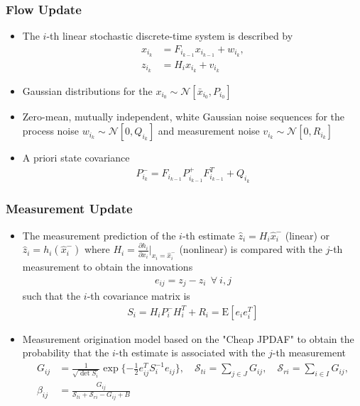 \documentclass[hyperref={pdftex,pdfpagemode=none,pdfstartview=FitH},10pt]{beamer}
\newcommand{\deriv}[2]{\ensuremath{\frac{\partial #1}{\partial #2}}}
\begin{document}
\begin{frame}
\frametitle{Flow Update}

\begin{itemize}
\item The $i$-th linear stochastic discrete-time system is described by
\begin{align}
x_{i_{k}} & = F_{i_{k-1}} x_{i_{k-1}} + w_{i_{k}},\label{eqn:xkp}\\
z_{i_k} & = H_ix_{i_k} + v_{i_k}
\end{align}
\item Gaussian distributions for the $x_{i_0} \sim \mathcal{N}[\bar x_{i_0}, P_{i_0}]$
\item Zero-mean, mutually independent, white Gaussian noise sequences for the process noise $w_{i_k} \sim \mathcal{N}[0,Q_{i_k}]$ and measurement noise $v_{i_k} \sim \mathcal{N}[0,R_{i_k}]$
\item A priori state covariance
\begin{align}
P_{i_{k}}^- = F_{i_{k-1}} P_{i_{k-1}}^+ F_{i_{k-1}}^T + Q_{i_{k}}
\end{align}
\end{itemize}

\end{frame}

\begin{frame}
\frametitle{Measurement Update}

\begin{itemize}
\item The measurement prediction of the $i$-th estimate $\hat z_i = H_i\hat x_{i}^-$ (linear) or $\hat z_i = h_i(\hat x_{i}^-)$ where $H_i=\deriv{h_i}{x_i}\bigg|_{x_i=\hat x_{i}^-}$ (nonlinear) is compared with the $j$-th measurement to obtain the innovations
\begin{align}
e_{ij} = z_j - \hat z_i\ \ \forall\ i,j
\end{align}
such that the $i$-th covariance matrix is
\begin{align}
S_{i}=H_{i}P_{i}^{-}H_{i}^T+R_{i}=\mathrm{E}[e_{i}e_i^{T}]
\end{align}
\item Measurement origination model based on the "Cheap JPDAF" to obtain the probability that the $i$-th estimate is associated with the $j$-th measurement
\begin{align}
G_{ij}&=\frac1{\sqrt{\det{S_{i}}}}\exp{\{-\frac12e_{ij}^TS_{i}^{-1}e_{ij}\}},
\quad
\mathcal{S}_{ti}=\sum\limits_{j\in J}G_{ij}, 
\quad 
\mathcal{S}_{ri}=\sum\limits_{i\in I}G_{ij},
\\
\beta_{ij}&=\frac{G_{ij}}{\mathcal{S}_{ti}+\mathcal{S}_{ri}-G_{ij}+B}
\end{align}
\end{itemize}

\end{frame}
\end{document}
